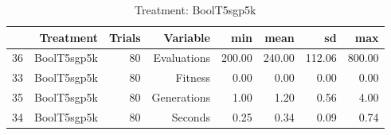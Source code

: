 \begin{table}[ht]
\centering
\begin{tabular}{rrrrrrrr}
  \hline
 & Treatment & Trials & Variable & min & mean & sd & max \\ 
  \hline
36 & BoolT5sgp5k &  80 & Evaluations & 200.00 & 240.00 & 112.06 & 800.00 \\ 
  33 & BoolT5sgp5k &  80 & Fitness & 0.00 & 0.00 & 0.00 & 0.00 \\ 
  35 & BoolT5sgp5k &  80 & Generations & 1.00 & 1.20 & 0.56 & 4.00 \\ 
  34 & BoolT5sgp5k &  80 & Seconds & 0.25 & 0.34 & 0.09 & 0.74 \\ 
   \hline
\end{tabular}
\caption{Treatment: BoolT5sgp5k} 
\end{table}
